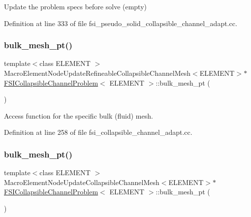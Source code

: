 Update the problem specs before solve (empty) 



Definition at line 333 of file fsi\+\_\+pseudo\+\_\+solid\+\_\+collapsible\+\_\+channel\+\_\+adapt.\+cc.

\mbox{\label{classFSICollapsibleChannelProblem_a6c031288ea229296c10e5f41c7b3e99e}} 
\subsubsection{\texorpdfstring{bulk\+\_\+mesh\+\_\+pt()}{bulk\_mesh\_pt()}\hspace{0.1cm}{\footnotesize\ttfamily [1/6]}}
{\footnotesize\ttfamily template$<$class E\+L\+E\+M\+E\+NT $>$ \\
Macro\+Element\+Node\+Update\+Refineable\+Collapsible\+Channel\+Mesh$<$E\+L\+E\+M\+E\+NT$>$$\ast$ \hyperlink{classFSICollapsibleChannelProblem}{F\+S\+I\+Collapsible\+Channel\+Problem}$<$ E\+L\+E\+M\+E\+NT $>$\+::bulk\+\_\+mesh\+\_\+pt (\begin{DoxyParamCaption}{ }\end{DoxyParamCaption})\hspace{0.3cm}{\ttfamily [inline]}}



Access function for the specific bulk (fluid) mesh. 



Definition at line 258 of file fsi\+\_\+collapsible\+\_\+channel\+\_\+adapt.\+cc.

\mbox{\label{classFSICollapsibleChannelProblem_a5ea2780b4f97b65b5c122a952093e6c2}} 
\subsubsection{\texorpdfstring{bulk\+\_\+mesh\+\_\+pt()}{bulk\_mesh\_pt()}\hspace{0.1cm}{\footnotesize\ttfamily [2/6]}}
{\footnotesize\ttfamily template$<$class E\+L\+E\+M\+E\+NT $>$ \\
Macro\+Element\+Node\+Update\+Collapsible\+Channel\+Mesh$<$E\+L\+E\+M\+E\+NT$>$$\ast$ \hyperlink{classFSICollapsibleChannelProblem}{F\+S\+I\+Collapsible\+Channel\+Problem}$<$ E\+L\+E\+M\+E\+NT $>$\+::bulk\+\_\+mesh\+\_\+pt (\begin{DoxyParamCaption}{ }\end{DoxyParamCaption})\hspace{0.3cm}{\ttfamily [inline]}}



